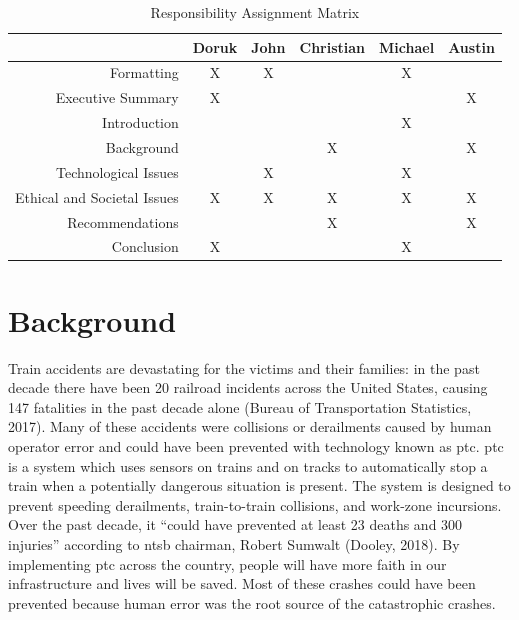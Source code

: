 \documentclass[11pt, titlepage]{article}
\begin{document}
\begin{table}[htbp]
    \begin{center}
        \caption{Responsibility Assignment Matrix}
        \begin{tabular}{r|c c c c c }
            & Doruk & John & Christian & Michael & Austin\\
            \hline
            Formatting & X & X & & X & \\
            Executive Summary & X & & & & X \\
            Introduction & & & & X & \\
            Background & & & X & & X\\
            Technological Issues & & X & & X & \\
            Ethical and Societal Issues & X & X & X & X & X\\
            Recommendations & & & X & & X\\
            Conclusion & X & & & X & \\
        \end{tabular}
    \end{center}
\end{table}

\clearpage
\pagebreak

\section{Background}

Train accidents are devastating for the victims and their families: in the past
decade there have been 20 railroad incidents across the United States, causing
147 fatalities in the past decade alone (Bureau of Transportation Statistics,
2017). Many of these accidents were collisions or derailments caused by human
operator error and could have been prevented with technology known as \gls{ptc}.
\gls{ptc} is a system which uses sensors on trains and on tracks to automatically
stop a train when a potentially dangerous situation is present. The system is
designed to prevent speeding derailments, train-to-train collisions, and
work-zone incursions. Over the past decade, it ``could have prevented at least 23
deaths and 300 injuries'' according to \gls{ntsb} chairman, Robert Sumwalt
(Dooley, 2018). By implementing \gls{ptc} across the country, people will have
more faith in our infrastructure and lives will be saved. Most of these crashes
could have been prevented because human error was the root source of the
catastrophic crashes.
\end{document}
